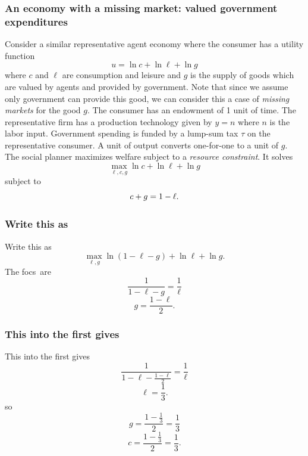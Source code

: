 \documentclass[aspectratio=169]{ltx-talk}
\begin{document}
\begin{frame}
\frametitle{An economy with a missing market: valued government expenditures}
Consider a similar representative agent economy where the consumer has a
utility function 
\begin{equation*}
u=\ln c+\ln \ell +\ln g
\end{equation*}%
where $c$ and $\ell $ are consumption and leisure and $g$ is the supply of
goods which are valued by agents and provided by government. Note that since
we assume only government can provide this good, we can consider this a case
of \textit{missing markets} for the good $g$. The consumer has an endowment
of 1 unit of time. The representative firm has a production technology given
by $y=n$ where $n$ is the labor input. Government spending is funded by a
lump-sum tax $\tau $ on the representative consumer. A unit of output
converts one-for-one to a unit of $g$. The social planner maximizes welfare
subject to a \textit{resource constraint}. It solves 
\begin{equation*}
\underset{\ell ,c,g}{\max }\ln c+\ln \ell +\ln g
\end{equation*}%
subject to%
\begin{equation}
c+g=1-\ell .  \notag
\end{equation}%
\end{frame}

\begin{frame}
\frametitle{Write this as}
Write this as%
\begin{equation*}
\underset{\ell ,g}{\max }\ln \left( 1-\ell -g\right) +\ln \ell +\ln g.
\end{equation*}%
The focs\ are 
\begin{equation*}
\frac{1}{1-\ell -g}=\frac{1}{\ell }
\end{equation*}%
\begin{equation*}
g=\frac{1-\ell }{2}.
\end{equation*}%
\end{frame}

\begin{frame}
\frametitle{This into the first gives}
This into the first gives%
\begin{equation*}
\frac{1}{1-\ell -\frac{1-\ell }{2}}=\frac{1}{\ell }
\end{equation*}%
\begin{equation*}
\ell =\frac{1}{3}.
\end{equation*}%
so 
\begin{equation*}
g=\frac{1-\frac{1}{3}}{2}=\frac{1}{3}
\end{equation*}%
\begin{equation*}
c=\frac{1-\frac{1}{3}}{2}=\frac{1}{3}.
\end{equation*}
\end{frame}
\end{document}
